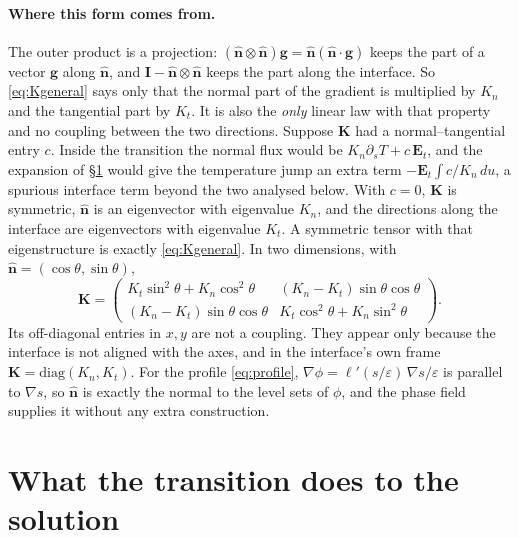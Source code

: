 \documentclass[11pt]{article}
\newcommand{\bn}{\hat{\mathbf n}}
\newcommand{\bI}{\mathbf I}
\newcommand{\bK}{\mathbf K}
\newcommand{\Kt}{K_{t}}
\newcommand{\Kn}{K_{n}}
\begin{document}
\paragraph{Where this form comes from.} The outer product is a projection:
$(\bn\otimes\bn)\mathbf g=\bn(\bn\cdot\mathbf g)$ keeps the part of a vector
$\mathbf g$ along $\bn$, and $\bI-\bn\otimes\bn$ keeps the part along the
interface. So \eqref{eq:Kgeneral} says only that the normal part of the gradient
is multiplied by $\Kn$ and the tangential part by $\Kt$. It is also the
\emph{only} linear law with that property and no coupling between the two
directions. Suppose $\bK$ had a normal--tangential entry $c$. Inside the
transition the normal flux would be $\Kn\partial_sT+c\,\mathbf E_t$, and the
expansion of \S\ref{sec:inner} would give the temperature jump an extra term
$-\mathbf E_t\!\int c/\Kn\,du$, a spurious interface term beyond the two
analysed below. With $c=0$, $\bK$ is symmetric, $\bn$ is an eigenvector with
eigenvalue $\Kn$, and the directions along the interface are eigenvectors with
eigenvalue $\Kt$. A symmetric tensor with that eigenstructure is exactly
\eqref{eq:Kgeneral}. In two dimensions, with $\bn=(\cos\theta,\sin\theta)$,
\[
\bK=\begin{pmatrix}\Kt\sin^2\theta+\Kn\cos^2\theta & (\Kn-\Kt)\sin\theta\cos\theta\\
(\Kn-\Kt)\sin\theta\cos\theta & \Kt\cos^2\theta+\Kn\sin^2\theta\end{pmatrix}.
\]
Its off-diagonal entries in $x,y$ are not a coupling. They appear only because
the interface is not aligned with the axes, and in the interface's own frame
$\bK=\mathrm{diag}(\Kn,\Kt)$. For the profile \eqref{eq:profile},
$\nabla\phi=\ell'(s/\varepsilon)\,\nabla s/\varepsilon$ is parallel to
$\nabla s$, so $\bn$ is exactly the normal to the level sets of $\phi$, and
the phase field supplies it without any extra construction.

\section{What the transition does to the solution}
\label{sec:inner}
\end{document}
